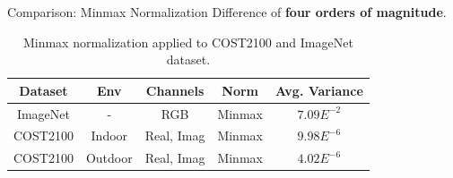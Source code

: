 \documentclass{beamer}
\begin{document}

  \begin{frame}{Comparison: Minmax Normalization}
    Difference of \textbf{four orders of magnitude}.
    \footnotesize{
    \begin{table}[htb]
      \begin{center}
        \begin{tabular}{|c|c|c|c|c|}
        \hline
        \textbf{Dataset} & \textbf{Env} & \textbf{Channels} & \textbf{Norm} & \textbf{Avg. Variance} \\ \hline
        ImageNet         & -            & RGB                 & Minmax                 & \underline{$7.09E^{-2}$}       \\ \hline
        COST2100         & Indoor       & Real, Imag          & Minmax                 & \underline{$9.98E^{-6}$}       \\ \hline          
        COST2100         & Outdoor      & Real, Imag          & Minmax                 & \underline{$4.02E^{-6}$}       \\ \hline
        \end{tabular}
        \caption{Minmax normalization applied to COST2100 and ImageNet dataset.}
        \label{tab:minmax-compare} 
      \end{center}
    \end{table}
    }
  \end{frame}
\end{document}

